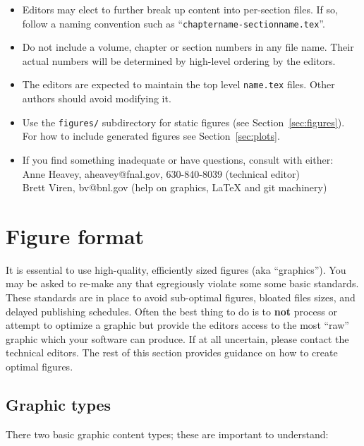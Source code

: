 \begin{itemize}
\item Editors may elect to further break up content into per-section
  files.
  If so, follow a naming convention such as
  ``\texttt{chaptername-sectionname.tex}''.
\item Do not include a volume, chapter or section numbers in any file
  name.
  Their actual numbers will be determined by high-level ordering by
  the editors. 
\item The editors are expected to maintain the top level
  \texttt{name.tex} files. Other authors should avoid modifying it.
\item Use the \texttt{figures/} subdirectory for static figures (see
  Section~\ref{sec:figures}). For how to include generated figures see
  Section~\ref{sec:plots}.
\item If you find something inadequate or have questions, consult with either: \\
  Anne Heavey, aheavey@fnal.gov, 630-840-8039 (technical editor)\\
  Brett Viren, bv@bnl.gov (help on graphics, \LaTeX{} and git machinery)
\end{itemize}



\section{Figure format}
\label{sec:figure-format}

It is essential to use high-quality, efficiently sized figures (aka
``graphics'').
You may be asked to re-make any that egregiously violate some some
basic standards.
These standards are in place to avoid sub-optimal figures, bloated
files sizes, and delayed publishing schedules.  
Often the best thing to do is to \textbf{not} process or attempt to
optimize a graphic but provide the editors access to the most ``raw''
graphic which your software can produce.
If at all uncertain, please contact the technical editors.
The rest of this section provides guidance on how to create optimal
figures.

\subsection{Graphic types}
\label{sec:graphic-types}

There two basic graphic content types; these are important to understand:

